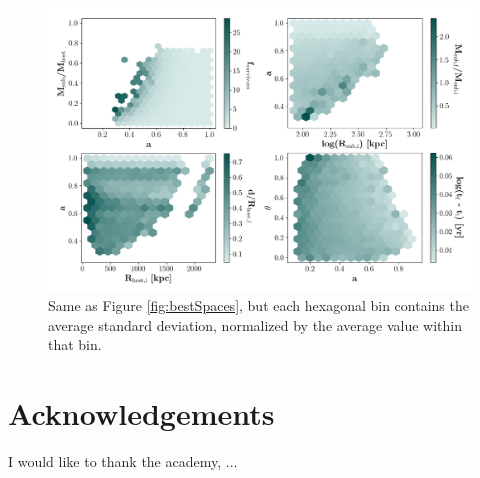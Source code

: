 \documentclass[fleqn,usenatbib]{mnras}
\begin{document}
\begin{figure}
	\includegraphics[width=\textwidth]{Figures/stdev_bestSpaces}
    \caption{Same as Figure \ref{fig:bestSpaces}, but each hexagonal bin contains the average standard deviation, normalized by the average value within that bin.}
    \label{fig:stdev_bestSpaces}
\end{figure}

\section*{Acknowledgements}

I would like to thank the academy, ...




%
\end{document}
